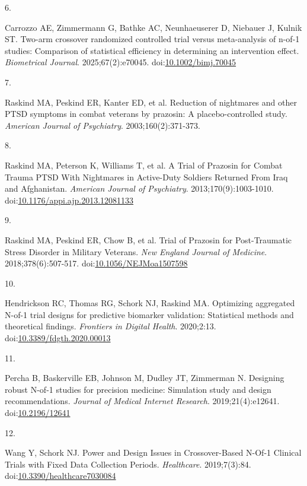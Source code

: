 \documentclass[
  11pt,
]{article}
\newlength{\cslhangindent}
\newlength{\csllabelwidth}
\newenvironment{CSLReferences}[2] %
 {\begin{list}{}{%
  \setlength{\itemindent}{0pt}
  \setlength{\leftmargin}{0pt}
  \setlength{\parsep}{0pt}
  \ifodd #1
   \setlength{\leftmargin}{\cslhangindent}
   \setlength{\itemindent}{-1\cslhangindent}
  \fi
  \setlength{\itemsep}{#2\baselineskip}}}
 {\end{list}}
\newcommand{\CSLLeftMargin}[1]{\parbox[t]{\csllabelwidth}{\strut#1\strut}}
\newcommand{\CSLRightInline}[1]{\parbox[t]{\linewidth - \csllabelwidth}{\strut#1\strut}}
\begin{document}
\begin{CSLReferences}{0}{1}
\CSLLeftMargin{6. }%
\CSLRightInline{Carrozzo AE, Zimmermann G, Bathke AC, Neunhaeuserer D, Niebauer J, Kulnik ST. Two-arm crossover randomized controlled trial versus meta-analysis of n-of-1 studies: Comparison of statistical efficiency in determining an intervention effect. \emph{Biometrical Journal}. 2025;67(2):e70045. doi:\href{https://doi.org/10.1002/bimj.70045}{10.1002/bimj.70045}}

\CSLLeftMargin{7. }%
\CSLRightInline{{Raskind MA, Peskind ER, Kanter ED, et al.} Reduction of nightmares and other {PTSD} symptoms in combat veterans by prazosin: A placebo-controlled study. \emph{American Journal of Psychiatry}. 2003;160(2):371-373.}

\CSLLeftMargin{8. }%
\CSLRightInline{Raskind MA, Peterson K, Williams T, et al. A {Trial} of {Prazosin} for {Combat Trauma PTSD With Nightmares} in {Active-Duty Soldiers Returned From Iraq} and {Afghanistan}. \emph{American Journal of Psychiatry}. 2013;170(9):1003-1010. doi:\href{https://doi.org/10.1176/appi.ajp.2013.12081133}{10.1176/appi.ajp.2013.12081133}}

\CSLLeftMargin{9. }%
\CSLRightInline{Raskind MA, Peskind ER, Chow B, et al. Trial of {Prazosin} for {Post-Traumatic Stress Disorder} in {Military Veterans}. \emph{New England Journal of Medicine}. 2018;378(6):507-517. doi:\href{https://doi.org/10.1056/NEJMoa1507598}{10.1056/NEJMoa1507598}}

\CSLLeftMargin{10. }%
\CSLRightInline{Hendrickson RC, Thomas RG, Schork NJ, Raskind MA. Optimizing aggregated {N}-of-1 trial designs for predictive biomarker validation: Statistical methods and theoretical findings. \emph{Frontiers in Digital Health}. 2020;2:13. doi:\href{https://doi.org/10.3389/fdgth.2020.00013}{10.3389/fdgth.2020.00013}}

\CSLLeftMargin{11. }%
\CSLRightInline{Percha B, Baskerville EB, Johnson M, Dudley JT, Zimmerman N. Designing robust {N}-of-1 studies for precision medicine: Simulation study and design recommendations. \emph{Journal of Medical Internet Research}. 2019;21(4):e12641. doi:\href{https://doi.org/10.2196/12641}{10.2196/12641}}

\CSLLeftMargin{12. }%
\CSLRightInline{Wang Y, Schork NJ. Power and {Design Issues} in {Crossover-Based N-Of-1 Clinical Trials} with {Fixed Data Collection Periods}. \emph{Healthcare}. 2019;7(3):84. doi:\href{https://doi.org/10.3390/healthcare7030084}{10.3390/healthcare7030084}}


\end{CSLReferences}
\end{document}
